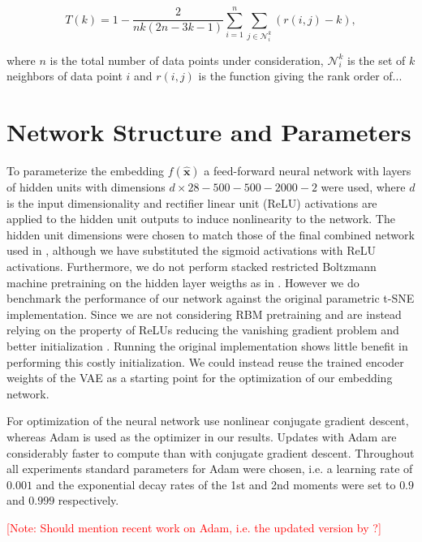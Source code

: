 $$T(k) = 1 - \frac{2}{nk (2n - 3k - 1)} \sum^n_{i=1} \sum_{j \in \mathcal{N}_{i}^{k}} (r(i, j) - k),$$

where $n$ is the total number of data points under consideration, $\mathcal{N}_{i}^{k}$ is the set of $k$ neighbors of data point $i$ and $r(i, j)$ is the function giving the rank order of...

\newpage

\section{Network Structure and Parameters}
\label{subsection:network_structure_and_parameters}

To parameterize the embedding $f(\mathbf{\hat{x}})$ a feed-forward neural network with layers of hidden units with dimensions $d \times 28 - 500 - 500 - 2000 - 2$ were used, where $d$ is the input dimensionality and rectifier linear unit (ReLU) activations are applied to the hidden unit outputs to induce nonlinearity to the network. The hidden unit dimensions were chosen to match those of the final combined network used in \citep{parametric_tsne}, although we have substituted the sigmoid activations with ReLU activations. Furthermore, we do not perform stacked restricted Boltzmann machine pretraining on the hidden layer weigths as in \citep{parametric_tsne}. However we do benchmark the performance of our network against the original parametric t-SNE implementation. Since we are not considering RBM pretraining and are instead relying on the property of ReLUs reducing the vanishing gradient problem \citep{relu} and better initialization \citep{xavier_initializer}. Running the original implementation shows little benefit in performing this costly initialization. We could instead reuse the trained encoder weights of the VAE as a starting point for the optimization of our embedding network.

For optimization of the neural network \cite{parametric_tsne} use nonlinear conjugate gradient descent, whereas Adam \citep{adam} is used as the optimizer in our results. Updates with Adam are considerably faster to compute than with conjugate gradient descent. Throughout all experiments standard parameters for Adam were chosen, i.e. a learning rate of $0.001$ and the exponential decay rates of the 1st and 2nd moments were set to $0.9$ and $0.999$ respectively.

\textcolor{red}{[Note: Should mention recent work on Adam, i.e. the updated version by \cite{on_the_convergence_of_adam}?]}


